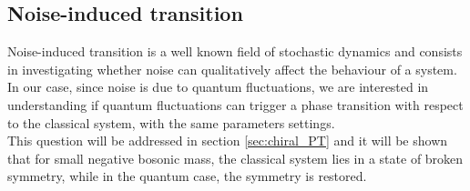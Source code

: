 \subsection{Noise-induced transition}
Noise-induced transition is a well known field of stochastic dynamics \cite{gardiner,noiseinduced,noiseinduced_2} and consists in investigating
whether noise can qualitatively affect the behaviour of a system. In our case, since noise is due to quantum fluctuations, we are interested in understanding if quantum fluctuations can trigger a phase transition with respect to the classical system, with the same parameters settings. \\
This question will be addressed in section \ref{sec:chiral_PT} and it will be shown that for small negative bosonic mass, the classical system lies in a state of broken symmetry, while in the quantum case, the symmetry is restored.

